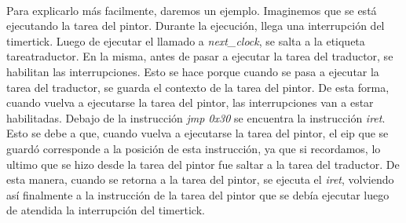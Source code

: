 \paragraph{}
Para explicarlo m\'as facilmente, daremos un ejemplo. Imaginemos que se est\'a ejecutando la tarea del pintor. Durante la ejecuci\'on, llega una interrupci\'on del timertick. Luego de ejecutar el llamado a \textit{next\_clock}, se salta a la etiqueta tareatraductor. En la misma, antes de pasar a ejecutar la tarea del traductor, se habilitan las interrupciones. Esto se hace porque cuando se pasa a ejecutar la tarea del traductor, se guarda el contexto de la tarea del pintor. De esta forma, cuando vuelva a ejecutarse la tarea del pintor, las interrupciones van a estar habilitadas. Debajo de la instrucci\'on \textit{jmp 0x30} se encuentra la instrucci\'on \textit{iret}. Esto se debe a que, cuando vuelva a ejecutarse la tarea del pintor, el eip que se guard\'o corresponde a la posici\'on de esta instrucci\'on, ya que si recordamos, lo ultimo que se hizo desde la tarea del pintor fue saltar a la tarea del traductor. De esta manera, cuando se retorna a la tarea del pintor, se ejecuta el \textit{iret}, volviendo as\'i finalmente a la instrucci\'on de la tarea del pintor que se deb\'ia ejecutar luego de atendida la interrupci\'on del timertick.